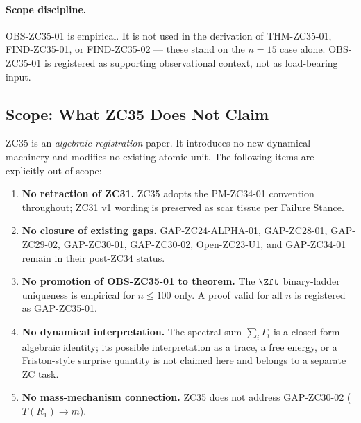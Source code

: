 \documentclass[12pt, a4paper]{article}
\begin{document}
\paragraph{Scope discipline.}
OBS-ZC35-01 is empirical. It is not used in the derivation of
THM-ZC35-01, FIND-ZC35-01, or FIND-ZC35-02 --- these stand on the
$n = 15$ case alone. OBS-ZC35-01 is registered as supporting
observational context, not as load-bearing input.

\subsection{Scope: What ZC35 Does Not Claim}
\label{sec:scope}

ZC35 is an \emph{algebraic registration} paper. It introduces no new
dynamical machinery and modifies no existing atomic unit. The following
items are explicitly out of scope:

\begin{enumerate}[leftmargin=*, noitemsep]
  \item \textbf{No retraction of ZC31.}
        ZC35 adopts the PM-ZC34-01 convention throughout; ZC31 v1
        wording is preserved as scar tissue per Failure Stance.

  \item \textbf{No closure of existing gaps.}
        GAP-ZC24-ALPHA-01, GAP-ZC28-01, GAP-ZC29-02, GAP-ZC30-01,
        GAP-ZC30-02, Open-ZC23-U1, and GAP-ZC34-01 remain in their
        post-ZC34 status.

  \item \textbf{No promotion of OBS-ZC35-01 to theorem.}
        The $\Zft$ binary-ladder uniqueness is empirical for $n \le 100$
        only. A proof valid for all $n$ is registered as GAP-ZC35-01.

  \item \textbf{No dynamical interpretation.}
        The spectral sum $\sum_i \Gamma_i$ is a closed-form algebraic
        identity; its possible interpretation as a trace, a free energy,
        or a Friston-style surprise quantity is not claimed here and
        belongs to a separate ZC task.

  \item \textbf{No mass-mechanism connection.}
        ZC35 does not address GAP-ZC30-02 ($T(R_1) \to m$).
\end{enumerate}

\end{document}
